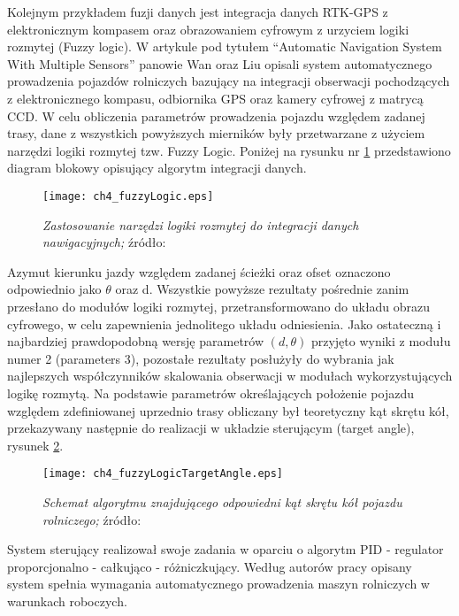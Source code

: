 \indent Kolejnym przykładem fuzji danych jest integracja danych RTK-GPS z elektronicznym kompasem oraz obrazowaniem cyfrowym z urzyciem logiki rozmytej (Fuzzy logic).
W artykule pod tytułem “Automatic Navigation System With Multiple Sensors” panowie Wan oraz Liu
opisali system automatycznego prowadzenia pojazdów rolniczych bazujący na integracji obserwacji pochodzących z elektronicznego kompasu,
odbiornika GPS oraz kamery cyfrowej z matrycą CCD. W celu obliczenia parametrów prowadzenia pojazdu względem zadanej trasy,
dane z wszystkich powyższych mierników były przetwarzane z użyciem narzędzi logiki rozmytej tzw. Fuzzy Logic.
Poniżej na rysunku nr \ref{fig:ch4_fuzzyLogic} przedstawiono diagram blokowy opisujący algorytm integracji danych.
\begin{figure}[H]
\centering
\texttt{[image: ch4\_fuzzyLogic.eps]}
\caption{\textit{Zastosowanie narzędzi logiki rozmytej do integracji danych nawigacyjnych;}
źródło: \cite[][strona 774]{CCTA_769_775}}
\label{fig:ch4_fuzzyLogic}
\end{figure}

Azymut kierunku jazdy względem zadanej ścieżki oraz ofset oznaczono odpowiednio jako $\theta$ oraz d.
Wszystkie powyższe rezultaty pośrednie zanim przesłano do modułów logiki rozmytej, przetransformowano do układu obrazu cyfrowego,
w celu zapewnienia jednolitego układu odniesienia. Jako ostateczną i najbardziej prawdopodobną wersję parametrów $(d, \theta )$
przyjęto wyniki z modułu numer 2 (parameters 3), pozostałe rezultaty posłużyły do wybrania jak najlepszych współczynników skalowania obserwacji
w modułach wykorzystujących logikę rozmytą. Na podstawie parametrów określających położenie pojazdu względem zdefiniowanej uprzednio trasy
obliczany był teoretyczny kąt skrętu kół, przekazywany następnie do realizacji w układzie sterującym (target angle), rysunek \ref{fig:ch4_fuzzyLogicTargetAngle}.
\begin{figure}[H]
\centering
\texttt{[image: ch4\_fuzzyLogicTargetAngle.eps]}
\caption{\textit{Schemat algorytmu znajdującego odpowiedni kąt skrętu kół pojazdu rolniczego;}
	źródło: \cite[][strona 775]{CCTA_769_775}}
\label{fig:ch4_fuzzyLogicTargetAngle}
\end{figure}
System sterujący realizował swoje zadania w oparciu o algorytm PID - regulator proporcjonalno - całkująco - różniczkujący.
Według autorów pracy \cite{CCTA_769_775} opisany system spełnia wymagania automatycznego prowadzenia maszyn rolniczych w warunkach roboczych.
